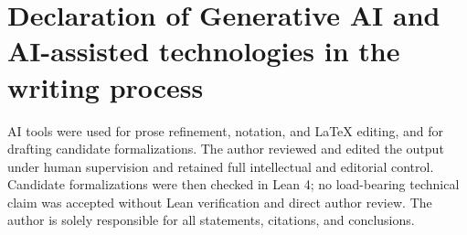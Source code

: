 \section*{Declaration of Generative AI and AI-assisted technologies in the writing process}

AI tools were used for prose refinement, notation, and \LaTeX{} editing, and for drafting candidate formalizations. The author reviewed and edited the output under human supervision and retained full intellectual and editorial control. Candidate formalizations were then checked in Lean 4; no load-bearing technical claim was accepted without Lean verification and direct author review. The author is solely responsible for all statements, citations, and conclusions.
